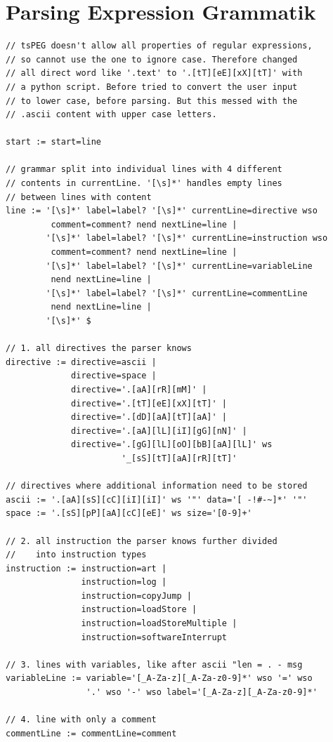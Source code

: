 \documentclass[a4paper, 11pt, onecolumn]{article}
\begin{document}
\section{Parsing Expression Grammatik}\label{app:peg}
\begin{lstlisting}[basicstyle=\ttfamily\footnotesize]
// tsPEG doesn't allow all properties of regular expressions,
// so cannot use the one to ignore case. Therefore changed
// all direct word like '.text' to '.[tT][eE][xX][tT]' with
// a python script. Before tried to convert the user input
// to lower case, before parsing. But this messed with the
// .ascii content with upper case letters.

start := start=line

// grammar split into individual lines with 4 different
// contents in currentLine. '[\s]*' handles empty lines
// between lines with content
line := '[\s]*' label=label? '[\s]*' currentLine=directive wso
         comment=comment? nend nextLine=line |
        '[\s]*' label=label? '[\s]*' currentLine=instruction wso
         comment=comment? nend nextLine=line |
        '[\s]*' label=label? '[\s]*' currentLine=variableLine
         nend nextLine=line |
        '[\s]*' label=label? '[\s]*' currentLine=commentLine
         nend nextLine=line |
        '[\s]*' $

// 1. all directives the parser knows
directive := directive=ascii |
             directive=space |
             directive='.[aA][rR][mM]' |
             directive='.[tT][eE][xX][tT]' |
             directive='.[dD][aA][tT][aA]' |
             directive='.[aA][lL][iI][gG][nN]' |
             directive='.[gG][lL][oO][bB][aA][lL]' ws
                       '_[sS][tT][aA][rR][tT]'

// directives where additional information need to be stored
ascii := '.[aA][sS][cC][iI][iI]' ws '"' data='[ -!#-~]*' '"'
space := '.[sS][pP][aA][cC][eE]' ws size='[0-9]+'

// 2. all instruction the parser knows further divided
//    into instruction types
instruction := instruction=art |
               instruction=log |
               instruction=copyJump |
               instruction=loadStore |
               instruction=loadStoreMultiple |
               instruction=softwareInterrupt

// 3. lines with variables, like after ascii "len = . - msg
variableLine := variable='[_A-Za-z][_A-Za-z0-9]*' wso '=' wso
                '.' wso '-' wso label='[_A-Za-z][_A-Za-z0-9]*'

// 4. line with only a comment
commentLine := commentLine=comment


\end{lstlisting}
\end{document}
